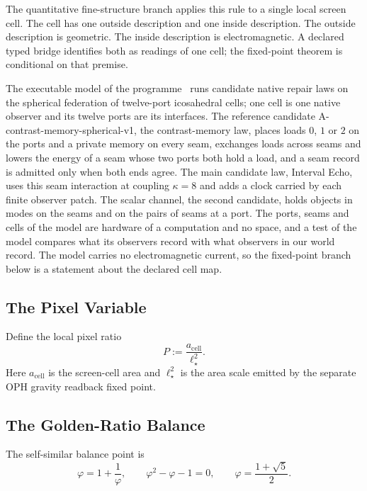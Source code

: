 \documentclass[11pt]{article}
\theoremstyle{remark}
\begin{document}
The quantitative fine-structure branch applies this rule to a single local
screen cell. The cell has one outside description and one inside description.
The outside description is geometric. The inside description is
electromagnetic. A declared typed bridge identifies both as readings of one
cell; the fixed-point theorem is conditional on that premise.

The executable model of the programme~\cite{ophmodel} runs candidate native repair laws on
the spherical federation of twelve-port icosahedral cells; one cell is one native observer
and its twelve ports are its interfaces. The reference candidate
A-contrast-memory-spherical-v1, the contrast-memory law,
places loads \(0\), \(1\) or \(2\) on the ports and a private memory on every seam, exchanges
loads across seams and lowers the energy of a seam whose two ports both hold a load, and a
seam record is admitted only when both ends agree. The main candidate law, Interval Echo, uses
this seam interaction at coupling \(\kappa=8\) and adds a clock carried by each finite
observer patch. The scalar channel, the second candidate, holds
objects in modes on the seams and on the pairs of seams at a port. The ports, seams and cells of the model are hardware of a computation and no space, and a test of the model compares what its observers record with what observers in our world record. The model carries no
electromagnetic current, so the fixed-point branch below is a statement about the declared
cell map.


\subsection{The Pixel Variable}
\label{sec:alpha-step-2}

Define the local pixel ratio
\begin{equation}
P:=\frac{a_{\mathrm{cell}}}{\ell_\star^2}.
\label{eq:Pdef}
\end{equation}
Here \(a_{\mathrm{cell}}\) is the screen-cell area and \(\ell_\star^2\) is the area scale emitted
by the separate OPH gravity readback fixed point.


\subsection{The Golden-Ratio Balance}
\label{sec:alpha-step-3}

The self-similar balance point is
\begin{equation}
\varphi=1+\frac{1}{\varphi},
\qquad
\varphi^2-\varphi-1=0,
\qquad
\varphi=\frac{1+\sqrt5}{2}.
\label{eq:phi}
\end{equation}
\end{document}
